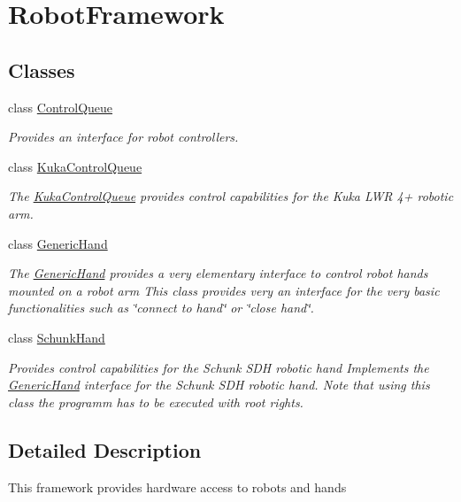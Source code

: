 \hypertarget{group__RobotFramework}{\section{\-Robot\-Framework}
\label{group__RobotFramework}
}
\subsection*{\-Classes}
\begin{DoxyCompactItemize}
\item 
class \hyperlink{classControlQueue}{\-Control\-Queue}
\begin{DoxyCompactList}\small\item\em \-Provides an interface for robot controllers. \end{DoxyCompactList}\item 
class \hyperlink{classKukaControlQueue}{\-Kuka\-Control\-Queue}
\begin{DoxyCompactList}\small\item\em \-The \hyperlink{classKukaControlQueue}{\-Kuka\-Control\-Queue} provides control capabilities for the \-Kuka \-L\-W\-R 4+ robotic arm. \end{DoxyCompactList}\item 
class \hyperlink{classGenericHand}{\-Generic\-Hand}
\begin{DoxyCompactList}\small\item\em \-The \hyperlink{classGenericHand}{\-Generic\-Hand} provides a very elementary interface to control robot hands mounted on a robot arm \-This class provides very an interface for the very basic functionalities such as \char`\"{}connect to hand\char`\"{} or \char`\"{}close hand\char`\"{}. \end{DoxyCompactList}\item 
class \hyperlink{classSchunkHand}{\-Schunk\-Hand}
\begin{DoxyCompactList}\small\item\em \-Provides control capabilities for the \-Schunk \-S\-D\-H robotic hand \-Implements the \hyperlink{classGenericHand}{\-Generic\-Hand} interface for the \-Schunk \-S\-D\-H robotic hand. \-Note that using this class the programm has to be executed with root rights. \end{DoxyCompactList}\end{DoxyCompactItemize}


\subsection{\-Detailed \-Description}
\-This framework provides hardware access to robots and hands 
